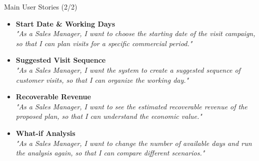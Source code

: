 \begin{frame}{Main User Stories (2/2)}
\begin{itemize}
    \item \textbf{Start Date \& Working Days}\\
    \textit{"As a Sales Manager, I want to choose the starting date of the visit campaign, so that I can plan visits for a specific commercial period."}
    
    \vspace{0.3cm}
    \item \textbf{Suggested Visit Sequence}\\
    \textit{"As a Sales Manager, I want the system to create a suggested sequence of customer visits, so that I can organize the working day."}
    
    \vspace{0.3cm}
    \item \textbf{Recoverable Revenue}\\
    \textit{"As a Sales Manager, I want to see the estimated recoverable revenue of the proposed plan, so that I can understand the economic value."}
    
    \vspace{0.3cm}
    \item \textbf{What-if Analysis}\\
    \textit{"As a Sales Manager, I want to change the number of available days and run the analysis again, so that I can compare different scenarios."}
\end{itemize}
\end{frame}
